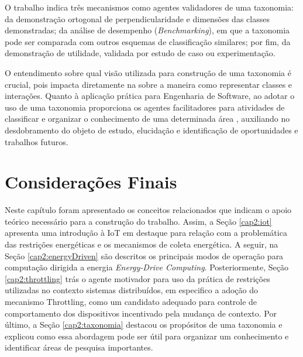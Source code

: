 O trabalho \cite{smite_empirically_2014} indica três mecanismos como agentes validadores de uma taxonomia: da demonstração ortogonal de perpendicularidade e dimensões das classes demonstradas; da análise de desempenho (\textit{Benchmarking}), em que a taxonomia pode ser comparada com outros esquemas de classificação similares; por fim, da demonstração de utilidade, validada por estudo de caso ou experimentação.

O entendimento sobre qual visão utilizada para construção de uma taxonomia é crucial, pois impacta diretamente na sobre a maneira como representar classes e interações. Quanto à aplicação prática para Engenharia de Software, ao adotar o uso de uma taxonomia proporciona os agentes facilitadores para atividades de classificar e organizar o conhecimento de uma determinada área \cite{usman_taxonomies_2017}, auxiliando no desdobramento do objeto de estudo, elucidação e identificação de oportunidades e trabalhos futuros.

\section{Considerações Finais}
 \label{cap2:consideracoesFinais}
 
 Neste capítulo foram apresentado os conceitos relacionados que indicam o apoio teórico necessário para a construção do trabalho. Assim, a Seção \ref{cap2:iot} apresenta uma introdução à IoT em destaque para relação com a problemática das restrições energéticas e os mecanismos de coleta energética. A seguir, na Seção \ref{cap2:energyDriven} são descritos os principais modos de operação para computação dirigida a energia \textit{Energy-Drive Computing}. Posteriormente, Seção \ref{cap2:throttling} trás o agente motivador para uso da prática de restrições utilizadas no contexto sistemas distribuídos, em especifico a adoção do mecanismo Throttling, como um candidato adequado para controle de comportamento dos dispositivos incentivado pela mudança de contexto. Por último, a Seção \ref{cap2:taxonomia} destacou os propósitos de uma taxonomia e explicou como essa abordagem pode ser útil para organizar um conhecimento e identificar áreas de pesquisa importantes.
